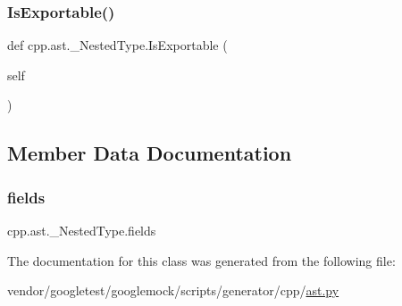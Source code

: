 \mbox{\label{classcpp_1_1ast_1_1___nested_type_a689f8b0dc20e6070938825eee483dd2f}} 
\subsubsection{\texorpdfstring{Is\+Exportable()}{IsExportable()}}
{\footnotesize\ttfamily def cpp.\+ast.\+\_\+\+Nested\+Type.\+Is\+Exportable (\begin{DoxyParamCaption}\item[{}]{self }\end{DoxyParamCaption})}



\subsection{Member Data Documentation}
\mbox{\label{classcpp_1_1ast_1_1___nested_type_aed69c37a409b4d26e6cfde2de3185d86}} 
\subsubsection{\texorpdfstring{fields}{fields}}
{\footnotesize\ttfamily cpp.\+ast.\+\_\+\+Nested\+Type.\+fields}



The documentation for this class was generated from the following file\+:\begin{DoxyCompactItemize}
\item 
vendor/googletest/googlemock/scripts/generator/cpp/\hyperlink{ast_8py}{ast.\+py}\end{DoxyCompactItemize}
